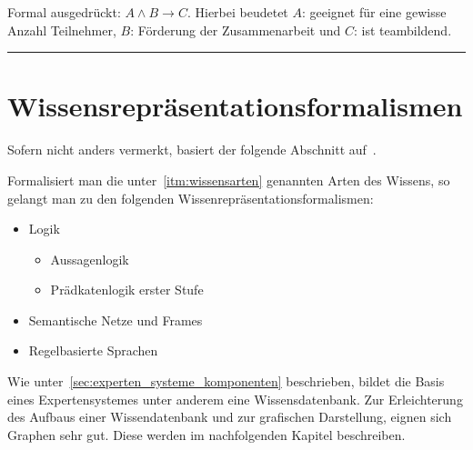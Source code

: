 Formal ausgedrückt: $A \wedge B \rightarrow C$. Hierbei beudetet $A$: geeignet für eine gewisse Anzahl Teilnehmer, $B$: Förderung der Zusammenarbeit und $C$: ist teambildend.\\

\noindent\rule[1ex]{\textwidth}{1pt}

\section{Wissensrepräsentationsformalismen}
\label{sec:wissensrepräsentationsformalismen}
Sofern nicht anders vermerkt, basiert der folgende Abschnitt auf~\cite[S. 32]{laemmel}.

Formalisiert man die unter~\ref{itm:wissensarten} genannten Arten des Wissens, so gelangt man zu den folgenden Wissenrepräsentationsformalismen:
\begin{itemize}
    \item Logik
        \begin{itemize}
            \item Aussagenlogik
            \item Prädkatenlogik erster Stufe
        \end{itemize}
    \item Semantische Netze und Frames
    \item Regelbasierte Sprachen
\end{itemize}

Wie unter~\ref{sec:experten_systeme_komponenten} beschrieben, bildet die Basis eines Expertensystemes unter anderem eine Wissensdatenbank. Zur Erleichterung des Aufbaus einer Wissendatenbank und zur grafischen Darstellung, eignen sich Graphen sehr gut. Diese werden im nachfolgenden Kapitel beschreiben.
